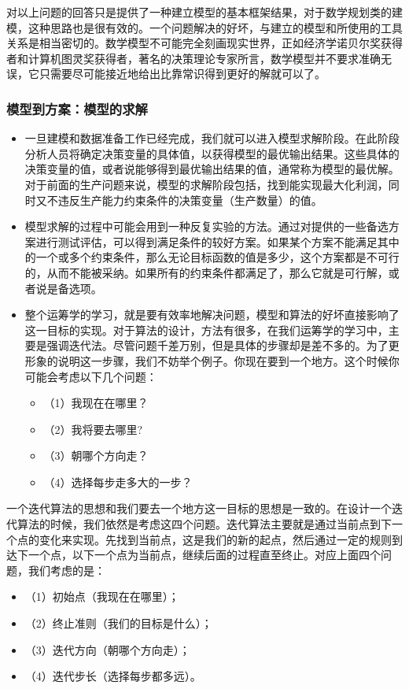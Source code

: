 \begin{frame}{\subsubsecname}
对以上问题的回答只是提供了一种建立模型的基本框架结果，对于数学规划类的建模，这种思路也是很有效的。一个问题解决的好坏，与建立的模型和所使用的工具关系是相当密切的。数学模型不可能完全刻画现实世界，正如经济学诺贝尔奖获得者和计算机图灵奖获得者，著名的决策理论专家所言，数学模型并不要求准确无误，它只需要尽可能接近地给出比靠常识得到更好的解就可以了。
\end{frame}

\subsubsection{模型到方案：模型的求解}
\begin{frame}{\subsubsecname}
    \begin{itemize}
        \item 一旦建模和数据准备工作已经完成，我们就可以进入模型求解阶段。在此阶段分析人员将确定决策变量的具体值，以获得模型的最优输出结果。这些具体的决策变量的值，或者说能够得到最优输出结果的值，通常称为模型的最优解。对于前面的生产问题来说，模型的求解阶段包括，找到能实现最大化利润，同时又不违反生产能力约束条件的决策变量（生产数量）的值。
\item 模型求解的过程中可能会用到一种反复实验的方法。通过对提供的一些备选方案进行测试评估，可以得到满足条件的较好方案。如果某个方案不能满足其中的一个或多个约束条件，那么无论目标函数的值是多少，这个方案都是不可行的，从而不能被采纳。如果所有的约束条件都满足了，那么它就是可行解，或者说是备选项。
\item 整个运筹学的学习，就是要有效率地解决问题，模型和算法的好坏直接影响了这一目标的实现。对于算法的设计，方法有很多，在我们运筹学的学习中，主要是强调迭代法。尽管问题千差万别，但是具体的步骤却是差不多的。为了更形象的说明这一步骤，我们不妨举个例子。你现在要到一个地方。这个时候你可能会考虑以下几个问题：
\begin{itemize}
    \item （1）我现在在哪里？
\item （2）我将要去哪里?
\item （3）朝哪个方向走？
\item （4）选择每步走多大的一步？
\end{itemize}
    \end{itemize}
\end{frame}

\begin{frame}{\subsubsecname}
一个迭代算法的思想和我们要去一个地方这一目标的思想是一致的。在设计一个迭代算法的时候，我们依然是考虑这四个问题。迭代算法主要就是通过当前点到下一个点的变化来实现。先找到当前点，这是我们的新的起点，然后通过一定的规则到达下一个点，以下一个点为当前点，继续后面的过程直至终止。对应上面四个问题，我们考虑的是：
\begin{itemize}
\item （1）初始点（我现在在哪里）；
\item （2）终止准则（我们的目标是什么）；
\item （3）迭代方向（朝哪个方向走）；
\item （4）迭代步长（选择每步都多远）。
\end{itemize}
\end{frame}

